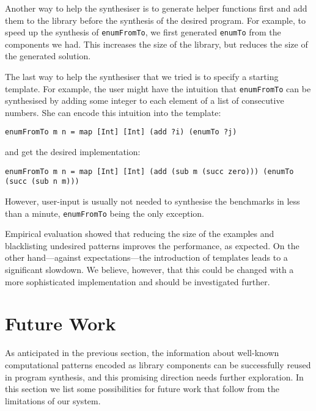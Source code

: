 Another way to help the synthesiser is to generate helper functions first and add them to the library before the synthesis of the desired program. For example, to speed up the synthesis of \lstinline!enumFromTo!, we first generated \lstinline!enumTo! from the components we had. This increases the size of the library, but reduces the size of the generated solution.

The last way to help the synthesiser that we tried is to specify a starting template. For example, the user might have the intuition that \lstinline!enumFromTo! can be synthesised by adding some integer to each element of a list of consecutive numbers. She can encode this intuition into the template:
\begin{lstlisting}[style=plain]
enumFromTo m n = map [Int] [Int] (add ?i) (enumTo ?j)
\end{lstlisting}
and get the desired implementation:
\begin{lstlisting}[style=plain]
enumFromTo m n = map [Int] [Int] (add (sub m (succ zero))) (enumTo (succ (sub n m)))
\end{lstlisting}
However, user-input is usually not needed to synthesise the benchmarks in less than a minute, \lstinline!enumFromTo! being the only exception.

Empirical evaluation showed that reducing the size of the examples and blacklisting undesired patterns improves the performance, as expected. On the other hand---against expectations---the introduction of templates leads to a significant slowdown. We believe, however, that this could be changed with a more sophisticated implementation and should be investigated further.
  
\section{Future Work}


As anticipated in the previous section, the information about well-known computational patterns encoded as library components can be successfully reused in program synthesis, and this promising direction needs further exploration. In this section we list some possibilities for future work that follow from the limitations of our system.

